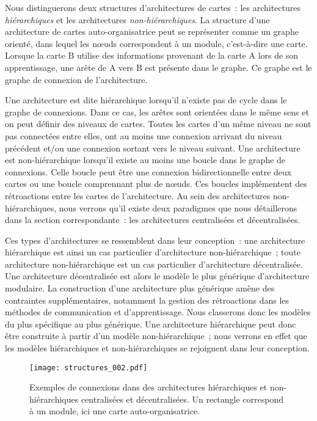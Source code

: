 \documentclass[../main]{subfiles}
\begin{document}
Nous distinguerons deux structures d'architectures de cartes~: les architectures \emph{hiérarchiques} et les architectures \emph{non-hiérarchiques}.
La structure d'une architecture de cartes auto-organisatrice peut se représenter comme un graphe orienté, dans lequel les n\oe{}uds correspondent à un module, c'est-à-dire une carte. Lorsque la carte B utilise des informations provenant de la carte A lors de son apprentissage, une arête de A vers B est présente dans le graphe. Ce graphe est le graphe de connexion de l'architecture.

Une architecture est dite hiérarchique lorsqu'il n'existe pas de cycle dans le graphe de connexions. Dans ce cas, les arêtes sont orientées dans le même sens et on peut définir des niveaux de cartes. Toutes les cartes d'un même niveau ne sont pas connectées entre elles, ont au moins une connexion arrivant du niveau précédent et/ou une connexion sortant vers le niveau suivant.
Une architecture est non-hiérarchique lorsqu'il existe au moins une boucle dans le graphe de connexions. Celle boucle peut être une connexion bidirectionnelle entre deux cartes ou une boucle comprennant plus de n\oe{}uds. Ces boucles implémentent des rétroactions entre les cartes de l'architecture.
Au sein des architectures non-hiérarchiques, nous verrons qu'il existe deux paradigmes que nous détaillerons dans la section correspondante~: les architectures centralisées et décentralisées.


Ces types d'architectures se ressemblent dans leur conception~: une architecture hiérarchique est ainsi un cas particulier d'architecture non-hiérarchique~; toute architecture non-hiérarchique est un cas particulier d'architecture décentralisée. Une architecture décentralisée est alors le modèle le plus générique d'architecture modulaire.
La construction d'une architecture plus générique amène des contraintes supplémentaires, notamment la gestion des rétroactions dans les méthodes de communication et d'apprentissage.
Nous classerons donc les modèles du plus spécifique au plus générique. Une architecture hiérarchique peut donc être construite à partir d'un modèle non-hiérarchique~; nous verrons en effet que les modèles hiérarchiques et non-hiérarchiques se rejoignent dans leur conception.

\begin{figure}
    \centering\texttt{[image: structures\_002.pdf]}
    \caption{Exemples de connexions dans des architectures hiérarchiques et non-hiérarchiques centralisées et décentralisées. Un rectangle correspond à un module, ici une carte auto-organisatrice. \label{fig:graphe}}
    \end{figure}
\end{document}
